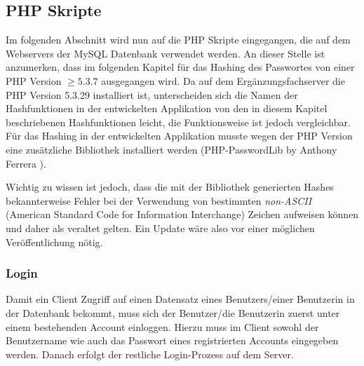 \documentclass[../main.tex]{subfiles}
\begin{document}
	
	\subsection{PHP Skripte}
	Im folgenden Abschnitt wird nun auf die PHP Skripte eingegangen, die auf dem Webservers der MySQL Datenbank verwendet werden. An dieser Stelle ist anzumerken, dass im folgenden Kapitel für das Hashing des Passwortes von einer PHP Version $\ge 5.3.7$ ausgegangen wird. Da auf dem Ergänzungsfachserver die PHP Version 5.3.29 installiert ist, unterscheiden sich die Namen der Hashfunktionen in der entwickelten Applikation von den in diesem Kapitel beschriebenen Hashfunktionen leicht, die Funktionsweise ist jedoch vergleichbar. Für das Hashing in der entwickelten Applikation  musste wegen der PHP Version eine zusätzliche Bibliothek installiert werden (PHP-PasswordLib by Anthony Ferrera \cite{PWLib}).
	
	Wichtig zu wissen ist jedoch, dass die mit der Bibliothek generierten Hashes bekannterweise Fehler bei der Verwendung von bestimmten \emph{non-ASCII} (American Standard Code for Information Interchange) Zeichen aufweisen können und daher als veraltet gelten. Ein Update wäre also vor einer möglichen Veröffentlichung nötig. \cite{bcryptBug}
	
	\subsubsection{Login}
	Damit ein Client Zugriff auf einen Datensatz eines Benutzers/einer Benutzerin in der Datenbank bekommt, muss sich der Benutzer/die Benutzerin zuerst unter einem bestehenden Account einloggen. Hierzu muss im Client sowohl der Benutzername wie auch das Passwort eines registrierten Accounts eingegeben werden. Danach erfolgt der restliche Login-Prozess auf dem Server.
	 
\end{document}

